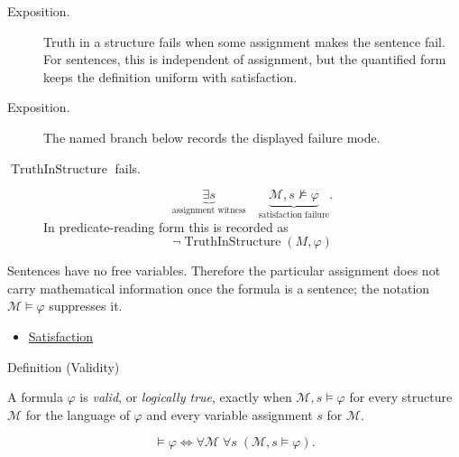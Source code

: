 \begin{remark*}
\begin{description}
  \item[Exposition.] Truth in a structure fails when some assignment makes the sentence fail. For
sentences, this is independent of assignment, but the quantified form keeps the
definition uniform with satisfaction.
\end{description}
\end{remark*}

\begin{remark*}
\begin{description}
  \item[Exposition.] The named branch below records the displayed failure mode.
\item[\(\operatorname{TruthInStructure}\) fails.] \[
\underbrace{\exists s}_{\text{assignment witness}}
\quad
\underbrace{\mathcal M,s\not\models\varphi}_{\text{satisfaction failure}}.
\]
  In predicate-reading form this is recorded as
  \[
    \neg\operatorname{TruthInStructure}(M,\varphi)
  \]
\end{description}
\end{remark*}

\begin{remark*}[Interpretation]
Sentences have no free variables. Therefore the particular assignment does not
carry mathematical information once the formula is a sentence; the notation
\(\mathcal M\models\varphi\) suppresses it.
\end{remark*}

\begin{dependencies}
\begin{itemize}
  \item \hyperref[def:fol-satisfaction]{Satisfaction}
\end{itemize}
\end{dependencies}

\begin{definitionbox}{Definition (Validity)}
\begin{definition}[Validity]
\label{def:validity}
A formula \(\varphi\) is \emph{valid}, or \emph{logically true}, exactly when
\(\mathcal M,s\models\varphi\) for every structure \(\mathcal M\) for the
language of \(\varphi\) and every variable assignment \(s\) for \(\mathcal M\).
\end{definition}
\end{definitionbox}

\begin{remark*}
\[
\models\varphi
\Longleftrightarrow
\forall \mathcal M\;\forall s\;(\mathcal M,s\models\varphi).
\]
\end{remark*}

